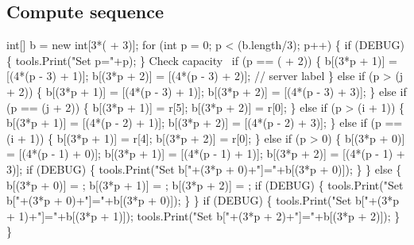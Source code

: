 \subsection{Compute sequence}
\nwenddocs{}\endmoddef\nwstartdeflinemarkup{}\nwenddeflinemarkup
int[] b = new int[3*( + 3)];
for (int p = 0; p < (b.length/3); p++) \{
  if (DEBUG) \{
    tools.Print("Set p="+p);
  \}
  \LA{}Check capacity~{\nwtagstyle{}}\RA{}
  if (p == ( + 2)) \{
    b[(3*p + 1)] = [(4*(p - 3) + 1)];
    b[(3*p + 2)] = [(4*(p - 3) + 2)];  // server label
  \} else if (p > (j + 2)) \{
    b[(3*p + 1)] = [(4*(p - 3) + 1)];
    b[(3*p + 2)] = [(4*(p - 3) + 3)];
  \} else if (p == (j + 2)) \{
    b[(3*p + 1)] = r[5];
    b[(3*p + 2)] = r[0];
  \} else if (p > (i + 1)) \{
    b[(3*p + 1)] = [(4*(p - 2) + 1)];
    b[(3*p + 2)] = [(4*(p - 2) + 3)];
  \} else if (p == (i + 1)) \{
    b[(3*p + 1)] = r[4];
    b[(3*p + 2)] = r[0];
  \} else if (p > 0) \{
    b[(3*p + 0)] = [(4*(p - 1) + 0)];
    b[(3*p + 1)] = [(4*(p - 1) + 1)];
    b[(3*p + 2)] = [(4*(p - 1) + 3)];
    if (DEBUG) \{
      tools.Print("Set b["+(3*p + 0)+"]="+b[(3*p + 0)]);
    \}
  \} else \{
    b[(3*p + 0)] = ;
    b[(3*p + 1)] = ;
    b[(3*p + 2)] = ;
    if (DEBUG) \{
      tools.Print("Set b["+(3*p + 0)+"]="+b[(3*p + 0)]);
    \}
  \}
  if (DEBUG) \{
    tools.Print("Set b["+(3*p + 1)+"]="+b[(3*p + 1)]);
    tools.Print("Set b["+(3*p + 2)+"]="+b[(3*p + 2)]);
  \}
\}
\nwendcode{}\nwdocspar


